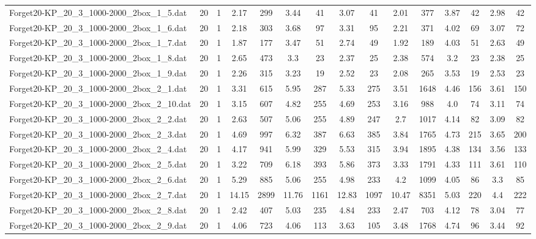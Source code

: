 \begin{table}[!ht]
{\begin{tabular}{lcccccccccccccc}
Forget20-KP\_20\_3\_1000-2000\_2box\_1\_5.dat & 20 & 1 & 2.17 & 299 & 3.44 & 41 & 3.07 & 41 & 2.01 & 377 & 3.87 & 42 & 2.98 & 42 \\
Forget20-KP\_20\_3\_1000-2000\_2box\_1\_6.dat & 20 & 1 & 2.18 & 303 & 3.68 & 97 & 3.31 & 95 & 2.21 & 371 & 4.02 & 69 & 3.07 & 72 \\
Forget20-KP\_20\_3\_1000-2000\_2box\_1\_7.dat & 20 & 1 & 1.87 & 177 & 3.47 & 51 & 2.74 & 49 & 1.92 & 189 & 4.03 & 51 & 2.63 & 49 \\
Forget20-KP\_20\_3\_1000-2000\_2box\_1\_8.dat & 20 & 1 & 2.65 & 473 & 3.3 & 23 & 2.37 & 25 & 2.38 & 574 & 3.2 & 23 & 2.38 & 25 \\
Forget20-KP\_20\_3\_1000-2000\_2box\_1\_9.dat & 20 & 1 & 2.26 & 315 & 3.23 & 19 & 2.52 & 23 & 2.08 & 265 & 3.53 & 19 & 2.53 & 23 \\
Forget20-KP\_20\_3\_1000-2000\_2box\_2\_1.dat & 20 & 1 & 3.31 & 615 & 5.95 & 287 & 5.33 & 275 & 3.51 & 1648 & 4.46 & 156 & 3.61 & 150 \\
Forget20-KP\_20\_3\_1000-2000\_2box\_2\_10.dat & 20 & 1 & 3.15 & 607 & 4.82 & 255 & 4.69 & 253 & 3.16 & 988 & 4.0 & 74 & 3.11 & 74 \\
Forget20-KP\_20\_3\_1000-2000\_2box\_2\_2.dat & 20 & 1 & 2.63 & 507 & 5.06 & 255 & 4.89 & 247 & 2.7 & 1017 & 4.14 & 82 & 3.09 & 82 \\
Forget20-KP\_20\_3\_1000-2000\_2box\_2\_3.dat & 20 & 1 & 4.69 & 997 & 6.32 & 387 & 6.63 & 385 & 3.84 & 1765 & 4.73 & 215 & 3.65 & 200 \\
Forget20-KP\_20\_3\_1000-2000\_2box\_2\_4.dat & 20 & 1 & 4.17 & 941 & 5.99 & 329 & 5.53 & 315 & 3.94 & 1895 & 4.38 & 134 & 3.56 & 133 \\
Forget20-KP\_20\_3\_1000-2000\_2box\_2\_5.dat & 20 & 1 & 3.22 & 709 & 6.18 & 393 & 5.86 & 373 & 3.33 & 1791 & 4.33 & 111 & 3.61 & 110 \\
Forget20-KP\_20\_3\_1000-2000\_2box\_2\_6.dat & 20 & 1 & 5.29 & 885 & 5.06 & 255 & 4.98 & 233 & 4.2 & 1099 & 4.05 & 86 & 3.3 & 85 \\
Forget20-KP\_20\_3\_1000-2000\_2box\_2\_7.dat & 20 & 1 & 14.15 & 2899 & 11.76 & 1161 & 12.83 & 1097 & 10.47 & 8351 & 5.03 & 220 & 4.4 & 222 \\
Forget20-KP\_20\_3\_1000-2000\_2box\_2\_8.dat & 20 & 1 & 2.42 & 407 & 5.03 & 235 & 4.84 & 233 & 2.47 & 703 & 4.12 & 78 & 3.04 & 77 \\
Forget20-KP\_20\_3\_1000-2000\_2box\_2\_9.dat & 20 & 1 & 4.06 & 723 & 4.06 & 113 & 3.63 & 105 & 3.48 & 1768 & 4.74 & 96 & 3.44 & 92 \\

\end{tabular}}
\end{table}
